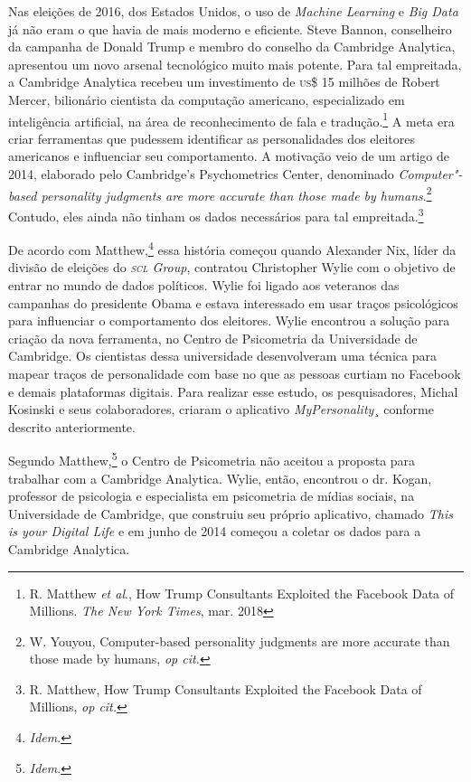 Nas eleições de 2016, dos Estados Unidos, o uso de \textit{Machine
Learning} e \textit{Big Data} já não eram o que havia de mais moderno e
eficiente. Steve Bannon, conselheiro da campanha de Donald Trump e
membro do conselho da Cambridge Analytica, apresentou um novo arsenal
tecnológico muito mais potente. Para tal empreitada, a Cambridge
Analytica recebeu um investimento de \textsc{us}\$ 15 milhões de Robert Mercer,
bilionário cientista da computação americano, especializado em
inteligência artificial, na área de reconhecimento de fala e tradução.\footnote{R. Matthew \textit{et al}., How Trump Consultants Exploited the
Facebook Data of Millions. \textit{The New York Times}, mar. 2018} A meta era criar ferramentas que pudessem identificar as personalidades dos eleitores
americanos e influenciar seu comportamento. A motivação veio de um
artigo de 2014, elaborado pelo Cambridge's Psychometrics Center,
denominado \textit{Computer"-based personality judgments are more
accurate than those made by humans}.\footnote{W. Youyou, Computer-based personality judgments are more accurate than
those made by humans, \textit{op cit.}} Contudo, eles
ainda não tinham os dados necessários para tal empreitada.\footnote{R. Matthew, How Trump Consultants Exploited the
Facebook Data of Millions, \textit{op cit.}}

De acordo com Matthew,\footnote{\textit{Idem}.} essa história começou quando
Alexander Nix, líder da divisão de eleições do \textit{\textsc{scl} Group},
contratou Christopher Wylie com o objetivo de entrar no mundo de dados
políticos. Wylie foi ligado aos veteranos das campanhas do presidente
Obama e estava interessado em usar traços psicológicos para influenciar
o comportamento dos eleitores. Wylie encontrou a solução para criação da
nova ferramenta, no Centro de Psicometria da Universidade de Cambridge.
Os cientistas dessa universidade desenvolveram uma técnica para mapear
traços de personalidade com base no que as pessoas curtiam no Facebook e
demais plataformas digitais. Para realizar esse estudo, os
pesquisadores, Michal Kosinski e seus colaboradores, criaram o
aplicativo \textit{MyPersonality}¸ conforme descrito anteriormente.

Segundo Matthew,\footnote{\textit{Idem}.} o Centro de Psicometria não aceitou a
proposta para trabalhar com a Cambridge Analytica. Wylie, então,
encontrou o dr. Kogan, professor de psicologia e especialista em
psicometria de mídias sociais, na Universidade de Cambridge, que
construiu seu próprio aplicativo, chamado \textit{This is your Digital
Life} e em junho de 2014 começou a coletar os dados para a Cambridge
Analytica.

